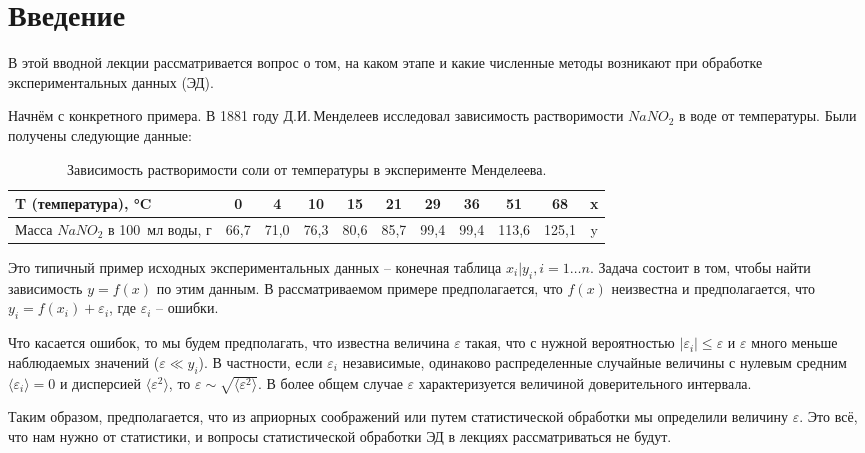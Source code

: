 \section{Введение}

В этой вводной лекции рассматривается вопрос о том, на каком этапе и какие численные методы возникают при обработке экспериментальных данных (ЭД).

Начнём с конкретного примера. В 1881 году Д.И.\,Менделеев исследовал зависимость растворимости $NaNO_{2}$ в воде от температуры. Были получены следующие данные:

\begin{table}[h]
	\small
	\caption{Зависимость растворимости соли от температуры в эксперименте Менделеева.}
	\label{table:mendeleev}
	\begin{tabular}{ p{0.3\width} *{10}{ | c} | }
		\graytable
		\toprule
		T (температура), °C & 0 & 4 & 10 & 15 & 21& 29& 36& 51&68 & x \\
		\midrule
		Масса $NaNO_{2}$ в 100~мл воды, г&
		66,7&71,0&76,3&80,6&85,7&99,4&99,4&113,6&125,1& y \\

		\bottomrule
	\end{tabular}
	
\end{table}

Это типичный пример исходных экспериментальных данных -- конечная таблица $x_i | y_i, i=1\dots n$. Задача состоит в том, чтобы найти зависимость $y = f(x)$ по этим данным. В рассматриваемом примере предполагается, что $f(x)$ неизвестна и предполагается, что $y_i = f(x_i) + \varepsilon _i$, где $\varepsilon _ i$ -- ошибки.

Что касается ошибок, то мы будем предполагать, что известна величина $\varepsilon$ такая, что с нужной вероятностью $|\varepsilon _i| \leq \varepsilon$ и $\varepsilon$ много меньше наблюдаемых значений ($\varepsilon \ll y_i$). В частности, если $\varepsilon_i$ независимые, одинаково распределенные случайные величины с нулевым средним $\langle \varepsilon_i \rangle = 0$ и дисперсией $\langle \varepsilon^2 \rangle$, то $\varepsilon \sim \sqrt{\langle \varepsilon^2 \rangle }$. В более общем случае $\varepsilon$ характеризуется величиной доверительного интервала. 

Таким образом, предполагается, что из априорных соображений или путем статистической обработки мы определили величину $\varepsilon$. Это всё, что нам нужно от статистики, и вопросы статистической обработки ЭД в лекциях рассматриваться не будут.



